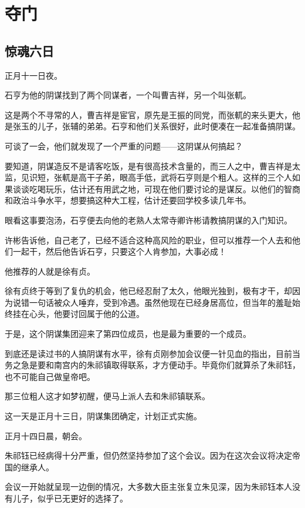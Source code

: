 \section{夺门}
\ifnum{}
	\begin{multicols}{\theparacolNo}
\fi
\subsection{惊魂六日}
正月十一日夜。

石亨为他的阴谋找到了两个同谋者，一个叫曹吉祥，另一个叫张軏。

这是两个不寻常的人，曹吉祥是宦官，原先是王振的同党，而张軏的来头更大，他是张玉的儿子，张辅的弟弟。石亨和他们关系很好，此时便凑在一起准备搞阴谋。

可谈了一会，他们就发现了一个严重的问题——这阴谋从何搞起？

要知道，阴谋造反不是请客吃饭，是有很高技术含量的，而三人之中，曹吉祥是太监，见识短，张軏是高干子弟，眼高手低，武将石亨则是个粗人。这样的三个人如果谈谈吃喝玩乐，估计还有用武之地，可现在他们要讨论的是谋反。以他们的智商和政治斗争水平，想要搞这种大工程，估计还要回学校多读几年书。

眼看这事要泡汤，石亨便去向他的老熟人太常寺卿许彬请教搞阴谋的入门知识。

许彬告诉他，自己老了，已经不适合这种高风险的职业，但可以推荐一个人去和他们一起干，然后他告诉石亨，只要这个人肯参加，大事必成！

他推荐的人就是徐有贞。

徐有贞终于等到了复仇的机会，他已经忍耐了太久，他眼光独到，极有才干，却因为说错一句话被众人唾弃，受到冷遇。虽然他现在已经身居高位，但当年的羞耻始终挂在心头，他要讨回属于他的公道。

于是，这个阴谋集团迎来了第四位成员，也是最为重要的一个成员。

到底还是读过书的人搞阴谋有水平，徐有贞刚参加会议便一针见血的指出，目前当务之急是要和南宫内的朱祁镇取得联系，才方便动手。毕竟你们就算杀了朱祁钰，也不可能自己做皇帝吧。

那三位粗人这才如梦初醒，便马上派人去和朱祁镇联系。

这一天是正月十三日，阴谋集团确定，计划正式实施。

正月十四日晨，朝会。

朱祁钰已经病得十分严重，但仍然坚持参加了这个会议。因为在这次会议将决定帝国的继承人。

会议一开始就呈现一边倒的情况，大多数大臣主张复立朱见深，因为朱祁钰本人没有儿子，似乎已无更好的选择了。


\end{multicols}
